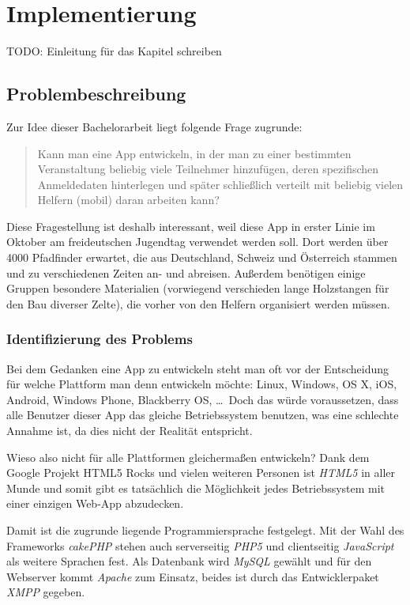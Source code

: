 \chapter{Implementierung}
TODO: Einleitung für das Kapitel schreiben

\section{Problembeschreibung}
Zur Idee dieser Bachelorarbeit liegt folgende Frage zugrunde:

\begin{quote}
	Kann man eine App entwickeln, in der man zu einer bestimmten Veranstaltung beliebig viele Teilnehmer hinzufügen, deren spezifischen Anmeldedaten hinterlegen und später schließlich verteilt mit beliebig vielen Helfern (mobil) daran arbeiten kann? 
\end{quote}

Diese Fragestellung ist deshalb interessant, weil diese App in erster Linie im Oktober am freideutschen Jugendtag verwendet werden soll. Dort werden über 4000 Pfadfinder erwartet, die aus Deutschland, Schweiz und Österreich stammen und zu verschiedenen Zeiten an- und abreisen. Außerdem benötigen einige Gruppen besondere Materialien (vorwiegend verschieden lange Holzstangen für den Bau diverser Zelte), die vorher von den Helfern organisiert werden müssen.\par

\subsection{Identifizierung des Problems}
Bei dem Gedanken eine App zu entwickeln steht man oft vor der Entscheidung für welche Plattform man denn entwickeln möchte: Linux, Windows, OS X, iOS, Android, Windows Phone, Blackberry OS, \dots \ Doch das würde voraussetzen, dass alle Benutzer dieser App das gleiche Betriebssystem benutzen, was eine schlechte Annahme ist, da dies nicht der Realität entspricht.\par

Wieso also nicht für alle Plattformen gleichermaßen entwickeln? Dank dem Google Projekt \glqq HTML5 Rocks\grqq{}\cite{html5rocksmain} und vielen weiteren Personen ist \emph{HTML5} in aller Munde und somit gibt es tatsächlich die Möglichkeit jedes Betriebssystem mit einer einzigen Web-App abzudecken.\par

Damit ist die zugrunde liegende Programmiersprache festgelegt. Mit der Wahl des Frameworks \emph{cakePHP} stehen auch serverseitig \emph{PHP5} und clientseitig \emph{JavaScript} als weitere Sprachen fest. Als Datenbank wird \emph{MySQL} gewählt und für den Webserver kommt \emph{Apache} zum Einsatz, beides ist durch das Entwicklerpaket \emph{XMPP} gegeben.

